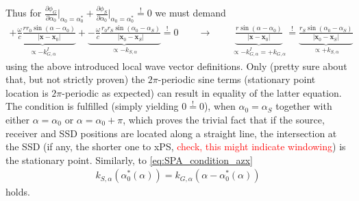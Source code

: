 \documentclass[a4paper,BCOR=15mm,10pt,twoside]{scrartcl}
\newcommand{\fscom}[2][red]{\textcolor{#1}{#2}}  %
\newcommand\wc{\frac{\omega}{c}}  %
\newcommand\azx{\alpha}  %
\renewcommand{\vec}[1]{\mathbf{#1}}  %
\begin{document}
Thus for $\frac{\partial \phi_G}{\partial \azx_0}\big|_{\azx_0=\azx_0^*} + \frac{\partial \phi_S}{\partial \azx_0}\big|_{\azx_0=\azx_0^*} \stackrel{!}{=} 0$ we must demand
\begin{align}
\underbrace{+\wc \frac{r r_0 \sin(\azx-\azx_0)}{|\vec{x} -\vec{x}_0|}}_{\propto -k_{G,\azx}^I} + \underbrace{-\wc \frac{r_0 r_S \sin(\azx_0 - \azx_S)}{|\vec{x}_0 - \vec{x}_S|}}_{\propto -k_{S,\azx}} \stackrel{!}{=} 0\qquad\rightarrow\qquad
\underbrace{\frac{r \sin(\azx-\azx_0)}{|\vec{x} -\vec{x}_0|}}_{\propto -k_{G,\azx}^I = +k_{G,\azx}} \stackrel{!}{=} \underbrace{\frac{r_S \sin(\azx_0 - \azx_S)}{|\vec{x}_0 - \vec{x}_S|}}_{\propto +k_{S,\azx}}
\end{align}
using the above introduced local wave vector definitions.
Only (pretty sure about that, but not strictly proven) the $2\pi$-periodic sine terms (stationary point location is $2\pi$-periodic as expected) can result in equality of the latter equation.
The condition is fulfilled (simply yielding $0 \stackrel{!}{=} 0$), when $\azx_0 = \azx_S$ together with either $\azx = \azx_0$ or $\azx = \azx_0 + \pi$, which proves the trivial fact that if the source, receiver and SSD positions are located along a straight line, the intersection at the SSD (if any, the shorter one to xPS, \fscom{check, this might indicate windowing}) is the stationary point. 
Similarly, to \eqref{eq:SPA_condition_azx}
\begin{align}
\label{eq:SPA_condition_azx}
k_{S,\azx}(\azx_0^*(\azx)) = k_{G,\azx}(\azx - \azx_0^*(\azx))
\end{align}
holds.
\end{document}
